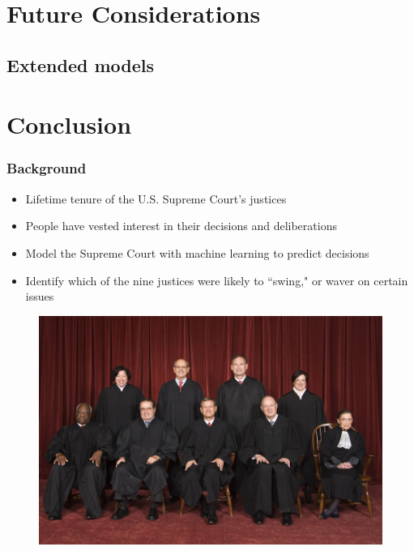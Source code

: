 \documentclass{beamer}
\begin{document}
\section{Future Considerations}
\subsection{Extended models}

\section{Conclusion}


\begin{frame}
\frametitle{Background}
\begin{itemize}
	 \item Lifetime tenure of the U.S. Supreme Court's justices
	 \item People have vested interest in their decisions and deliberations
	 \item Model the Supreme Court with machine learning to predict decisions
	 \item Identify which of the nine justices were likely to ``swing," or waver on certain issues
\end{itemize}

\begin{figure}[h]
\begin{center}
\includegraphics[width=0.6\columnwidth]{roberts6}
\end{center}
\end{figure}


\end{frame}

\end{document}

